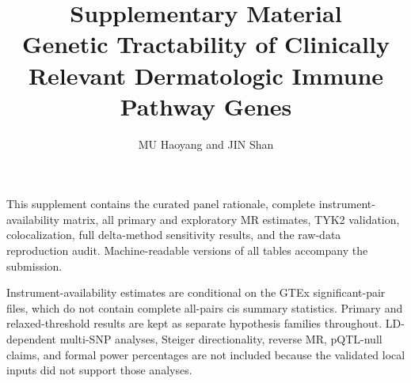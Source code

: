 \documentclass[10pt,a4paper]{article}
\title{Supplementary Material\\\large Genetic Tractability of Clinically Relevant Dermatologic Immune Pathway Genes}
\author{MU Haoyang and JIN Shan}
\date{}
\begin{document}
\maketitle
\noindent This supplement contains the curated panel rationale, complete instrument-availability matrix, all primary and exploratory MR estimates, TYK2 validation, colocalization, full delta-method sensitivity results, and the raw-data reproduction audit. Machine-readable versions of all tables accompany the submission.

\vspace{1em}
\noindent Instrument-availability estimates are conditional on the GTEx significant-pair files, which do not contain complete all-pairs cis summary statistics. Primary and relaxed-threshold results are kept as separate hypothesis families throughout. LD-dependent multi-SNP analyses, Steiger directionality, reverse MR, pQTL-null claims, and formal power percentages are not included because the validated local inputs did not support those analyses.
\clearpage
\end{document}
